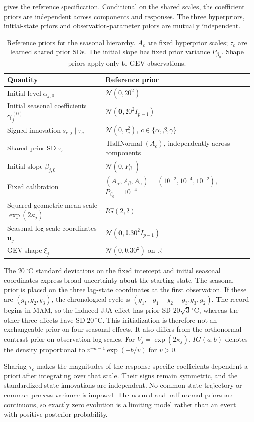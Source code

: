 \documentclass[11pt,a4paper]{article}
\newcommand{\N}{\mathcal N}
\newcommand{\Cdeg}{\,^\circ\mathrm{C}}
\begin{document}
 gives the reference specification. Conditional on
the shared scales, the coefficient priors are independent across
components and responses. The three hyperpriors, initial-state priors and
observation-parameter priors are mutually independent.
\begin{table}[!htbp]
\centering\small
\caption{Reference priors for the seasonal hierarchy. \(A_c\) are fixed
hyperprior scales; \(\tau_c\) are learned shared prior SDs. The initial
slope has fixed prior variance \(P_{\beta_0}\). Shape priors apply only
to GEV observations.}
\label{tab:supp-priors}
\begin{tabularx}{\linewidth}{@{}lX@{}}
\toprule
Quantity & Reference prior \tabularnewline
\midrule
Initial level \(\alpha_{j,0}\)
& \(\N(0,20^2)\) \tabularnewline
Initial seasonal coefficients \(\bm\gamma^{(0)}_j\)
& \(\N(\bm0,20^2I_{p-1})\) \tabularnewline
Signed innovation \(s_{c,j}\mid\tau_c\)
& \(\N(0,\tau_c^2)\), \(c\in\{\alpha,\beta,\gamma\}\) \tabularnewline
Shared prior SD \(\tau_c\)
& \(\operatorname{HalfNormal}(A_c)\), independently across components \tabularnewline
Initial slope \(\beta_{j,0}\)
& \(\N(0,P_{\beta_0})\) \tabularnewline
Fixed calibration
& \((A_\alpha,A_\beta,A_\gamma)=(10^{-2},10^{-4},10^{-2})\),
\(P_{\beta_0}=10^{-4}\) \tabularnewline
Squared geometric-mean scale \(\exp(2\kappa_j)\)
& \(IG(2,2)\) \tabularnewline
Seasonal log-scale coordinates \(\bm u_j\)
& \(\N(\bm0,0.30^2I_{p-1})\) \tabularnewline
GEV shape \(\xi_j\)
& \(\N(0,0.30^2)\) on \(\mathbb R\) \tabularnewline
\bottomrule
\end{tabularx}
\end{table}

The \(20\Cdeg\) standard deviations on the fixed intercept and initial
seasonal coordinates express broad uncertainty about the starting state.
The seasonal prior is placed on the three lag-state coordinates at the
first observation. If these are \((g_1,g_2,g_3)\), the chronological
cycle is \((g_1,-g_1-g_2-g_3,g_3,g_2)\). The record begins in MAM,
so the induced JJA effect has prior SD \(20\sqrt{3}\Cdeg\), whereas
the other three effects have SD \(20\Cdeg\). This initialization is
therefore not an exchangeable prior on four seasonal effects. It also
differs from the orthonormal contrast prior on observation log scales. For
\(V_j=\exp(2\kappa_j)\), \(IG(a,b)\) denotes the density proportional
to \(v^{-a-1}\exp(-b/v)\) for \(v>0\).

Sharing \(\tau_c\) makes the magnitudes of the response-specific
coefficients dependent a priori after integrating over that scale.
Their signs remain symmetric, and the standardized state innovations are
independent. No common state trajectory or common process variance is
imposed. The normal and half-normal priors are continuous, so exactly
zero evolution is a limiting model rather than an event with positive
posterior probability.
\end{document}
